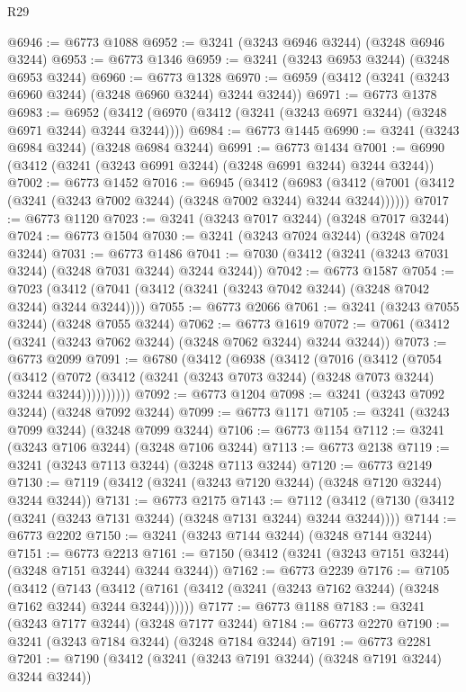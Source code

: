\begin{lexlean}{R29}
\begin{coremodule}
@6946 := @6773 @1088
@6952 := @3241 (@3243 @6946 @3244) (@3248 @6946 @3244)
@6953 := @6773 @1346
@6959 := @3241 (@3243 @6953 @3244) (@3248 @6953 @3244)
@6960 := @6773 @1328
@6970 := @6959 (@3412 (@3241 (@3243 @6960 @3244) (@3248 @6960 @3244) @3244 @3244))
@6971 := @6773 @1378
@6983 := @6952 (@3412 (@6970 (@3412 (@3241 (@3243 @6971 @3244) (@3248 @6971 @3244) @3244 @3244))))
@6984 := @6773 @1445
@6990 := @3241 (@3243 @6984 @3244) (@3248 @6984 @3244)
@6991 := @6773 @1434
@7001 := @6990 (@3412 (@3241 (@3243 @6991 @3244) (@3248 @6991 @3244) @3244 @3244))
@7002 := @6773 @1452
@7016 := @6945
    (@3412
      (@6983 (@3412 (@7001 (@3412 (@3241 (@3243 @7002 @3244) (@3248 @7002 @3244) @3244 @3244))))))
@7017 := @6773 @1120
@7023 := @3241 (@3243 @7017 @3244) (@3248 @7017 @3244)
@7024 := @6773 @1504
@7030 := @3241 (@3243 @7024 @3244) (@3248 @7024 @3244)
@7031 := @6773 @1486
@7041 := @7030 (@3412 (@3241 (@3243 @7031 @3244) (@3248 @7031 @3244) @3244 @3244))
@7042 := @6773 @1587
@7054 := @7023 (@3412 (@7041 (@3412 (@3241 (@3243 @7042 @3244) (@3248 @7042 @3244) @3244 @3244))))
@7055 := @6773 @2066
@7061 := @3241 (@3243 @7055 @3244) (@3248 @7055 @3244)
@7062 := @6773 @1619
@7072 := @7061 (@3412 (@3241 (@3243 @7062 @3244) (@3248 @7062 @3244) @3244 @3244))
@7073 := @6773 @2099
@7091 := @6780
    (@3412
      (@6938
        (@3412
          (@7016
            (@3412
              (@7054
                (@3412
                  (@7072 (@3412 (@3241 (@3243 @7073 @3244) (@3248 @7073 @3244) @3244 @3244))))))))))
@7092 := @6773 @1204
@7098 := @3241 (@3243 @7092 @3244) (@3248 @7092 @3244)
@7099 := @6773 @1171
@7105 := @3241 (@3243 @7099 @3244) (@3248 @7099 @3244)
@7106 := @6773 @1154
@7112 := @3241 (@3243 @7106 @3244) (@3248 @7106 @3244)
@7113 := @6773 @2138
@7119 := @3241 (@3243 @7113 @3244) (@3248 @7113 @3244)
@7120 := @6773 @2149
@7130 := @7119 (@3412 (@3241 (@3243 @7120 @3244) (@3248 @7120 @3244) @3244 @3244))
@7131 := @6773 @2175
@7143 := @7112 (@3412 (@7130 (@3412 (@3241 (@3243 @7131 @3244) (@3248 @7131 @3244) @3244 @3244))))
@7144 := @6773 @2202
@7150 := @3241 (@3243 @7144 @3244) (@3248 @7144 @3244)
@7151 := @6773 @2213
@7161 := @7150 (@3412 (@3241 (@3243 @7151 @3244) (@3248 @7151 @3244) @3244 @3244))
@7162 := @6773 @2239
@7176 := @7105
    (@3412
      (@7143 (@3412 (@7161 (@3412 (@3241 (@3243 @7162 @3244) (@3248 @7162 @3244) @3244 @3244))))))
@7177 := @6773 @1188
@7183 := @3241 (@3243 @7177 @3244) (@3248 @7177 @3244)
@7184 := @6773 @2270
@7190 := @3241 (@3243 @7184 @3244) (@3248 @7184 @3244)
@7191 := @6773 @2281
@7201 := @7190 (@3412 (@3241 (@3243 @7191 @3244) (@3248 @7191 @3244) @3244 @3244))

\end{coremodule}
\end{lexlean}
